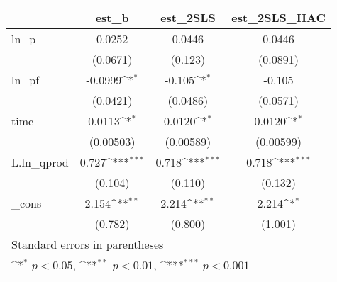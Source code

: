 {
\def\sym#1{\ifmmode^{#1}\else\(^{#1}\)\fi}
\begin{tabular}{l*{3}{c}}
\hline\hline
            &\multicolumn{1}{c}{est\_b}&\multicolumn{1}{c}{est\_2SLS}&\multicolumn{1}{c}{est\_2SLS\_HAC}\\
\hline
ln\_p        &      0.0252         &      0.0446         &      0.0446         \\
            &    (0.0671)         &     (0.123)         &    (0.0891)         \\
[1em]
ln\_pf       &     -0.0999\sym{*}  &      -0.105\sym{*}  &      -0.105         \\
            &    (0.0421)         &    (0.0486)         &    (0.0571)         \\
[1em]
time        &      0.0113\sym{*}  &      0.0120\sym{*}  &      0.0120\sym{*}  \\
            &   (0.00503)         &   (0.00589)         &   (0.00599)         \\
[1em]
L.ln\_qprod  &       0.727\sym{***}&       0.718\sym{***}&       0.718\sym{***}\\
            &     (0.104)         &     (0.110)         &     (0.132)         \\
[1em]
\_cons      &       2.154\sym{**} &       2.214\sym{**} &       2.214\sym{*}  \\
            &     (0.782)         &     (0.800)         &     (1.001)         \\
\hline\hline
\multicolumn{4}{l}{\footnotesize Standard errors in parentheses}\\
\multicolumn{4}{l}{\footnotesize \sym{*} \(p<0.05\), \sym{**} \(p<0.01\), \sym{***} \(p<0.001\)}\\
\end{tabular}
}
